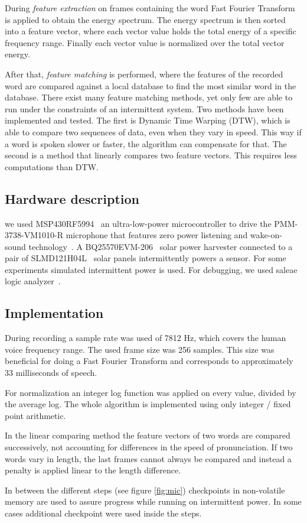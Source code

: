 During \textit{feature extraction} on frames containing the word Fast Fourier Transform is applied to obtain the energy spectrum. 
The energy spectrum is then sorted into a feature vector, where each vector value holds the total energy of a specific frequency range. Finally each vector value is normalized over the total vector energy.

After that, \textit{feature matching} is performed, where the features of the recorded word are compared against a local database to find the most similar word in the database.
There exist many feature matching methods, yet only few are able to run under the constraints of an intermittent system.
Two methods have been implemented and tested. The first is Dynamic Time Warping (DTW), which is able to compare two sequences of data, even when they vary in speed. This way if a word is spoken slower or faster, the algorithm can compensate for that.
The second is a method that linearly compares two feature vectors. This requires less computations than DTW.

\subsection{Hardware description}
we used MSP430RF5994~\cite{ti_msp430_website} an ultra-low-power microcontroller to drive the PMM-3738-VM1010-R microphone that features zero power listening and wake-on-sound technology~\cite{microphone}. A BQ25570EVM-206~\cite{BQ25570EVM-206_website} solar power harvester connected to a pair of SLMD121H04L~\cite{SLMD121H04L_website} solar panels intermittently powers a \sys sensor. For some experiments simulated intermittent power is used. For debugging, we used saleae logic analyzer~\cite{saleae}. 

\subsection{Implementation}
During recording a sample rate was used of 7812 Hz, which covers the human voice frequency range. The used frame size was 256 samples. This size was beneficial for doing a Fast Fourier Transform and corresponds to approximately 33 milliseconds of speech.

For normalization an integer log function was applied on every value, divided by the average log.
The whole algorithm is implemented using only integer / fixed point arithmetic.

In the linear comparing method the feature vectors of two words are compared successively, not accounting for differences in the speed of pronunciation. If two words vary in length, the last frames cannot always be compared and instead a penalty is applied linear to the length difference.

In between the different steps (see figure \ref{fig:mic}) checkpoints in non-volatile memory are used to assure progress while running on intermittent power. In some cases additional checkpoint were used inside the steps.


